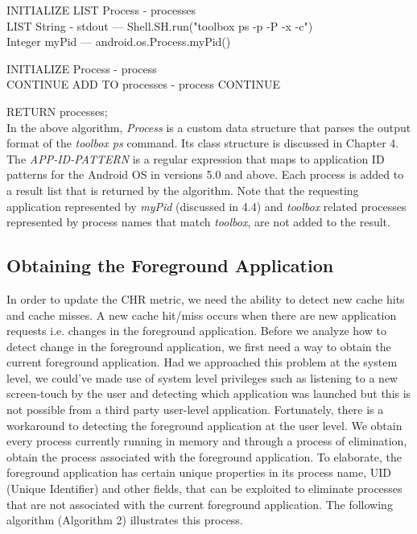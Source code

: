\documentclass[12pt]{uthesis-v12}  %
\begin{document}
			\begin{algorithm}[H]
				\SetAlgoLined
				
				INITIALIZE LIST Process - processes\\
				LIST String - stdout --- Shell.SH.run("toolbox ps -p -P -x -c")\\
				Integer myPid 		 --- android.os.Process.myPid()
				
				{
					INITIALIZE Process - process\\
					{
						{
							CONTINUE
						}
						{
							ADD TO processes - process
						}
					}
					{
						CONTINUE
					}
				}
				
				RETURN processes;\\
			
			\caption[Algorithm to get list of processes in RAM]{In the above algorithm, {\em Process} is a custom data structure that parses the output format of the {\em toolbox ps} command. Its class structure is discussed in Chapter 4. The {\em APP-ID-PATTERN} is a regular expression that maps to application ID patterns for the Android OS in versions 5.0 and above. Each process is added to a result list that is returned by the algorithm. Note that the requesting application represented by {\em myPid} (discussed in 4.4) and {\em toolbox} related processes represented by process names that match {\em toolbox}, are not added to the result.}
			\end{algorithm}			
			
		\subsection{Obtaining the Foreground Application}
			In order to update the CHR metric, we need the ability to detect new cache hits and cache misses. A new cache hit/miss occurs when there are new application requests i.e. changes in the foreground application. Before we analyze how to detect change in the foreground application, we first need a way to obtain the current foreground application. Had we approached this problem at the system level, we could've made use of system level privileges such as listening to a new screen-touch by the user and detecting which application was  launched but this is not possible from a third party user-level application. Fortunately, there is a workaround to detecting the foreground application at the user level. We obtain every process currently running in memory and through a process of elimination, obtain the process associated with the foreground application. To elaborate, the foreground application has certain unique properties in its process name, UID (Unique Identifier) and other fields, that can be exploited to eliminate processes that are not associated with the current foreground application. The following   algorithm (Algorithm 2) illustrates this process.
			
\end{document}
